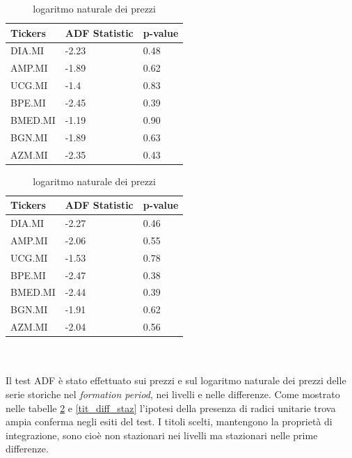 \documentclass[]{article}
\begin{document}
\begin{table}[H]

	\caption{Test di radice unitaria per i titoli nel \textit{formation period}}
	\begin{minipage}{.4\textwidth}
			\centering
		\caption{Prezzi}
		\begin{tabular}{@{}lll@{}}
			\toprule
			Tickers & ADF Statistic & p-value \\ \midrule
			DIA.MI  & -2.23         & 0.48    \\
			AMP.MI  & -1.89         & 0.62    \\
			UCG.MI  & -1.4          & 0.83    \\
			BPE.MI  & -2.45         & 0.39    \\
			BMED.MI & -1.19         & 0.90    \\
			BGN.MI  & -1.89         & 0.63    \\
			AZM.MI  & -2.35         & 0.43    \\ \bottomrule
		\end{tabular}
	\end{minipage}
    \begin{minipage}{.7\textwidth}
    	\centering
		\caption{logaritmo naturale dei prezzi}
		\begin{tabular}{@{}lll@{}}
			\toprule
			Tickers & ADF Statistic & p-value \\ \midrule
			DIA.MI  & -2.27         & 0.46    \\
			AMP.MI  & -2.06         & 0.55    \\
			UCG.MI  & -1.53         & 0.78    \\
			BPE.MI  & -2.47         & 0.38    \\
			BMED.MI & -2.44       & 0.39    \\
			BGN.MI  & -1.91         & 0.62    \\
			AZM.MI  & -2.04         & 0.56    \\ \bottomrule
		\end{tabular}
	\end{minipage}
	\label{tit_staz}
\end{table}
\
\\
\\
Il test ADF è stato effettuato  sui prezzi e sul logaritmo naturale dei prezzi delle serie storiche nel \textit{formation period}, nei livelli e nelle differenze. Come mostrato nelle tabelle \ref{tit_staz} e \ref{tit_diff_staz} l’ipotesi della presenza di radici unitarie trova ampia conferma negli esiti del test. I titoli scelti, mantengono la proprietà di integrazione, sono cioè non stazionari nei livelli ma stazionari nelle prime differenze.
\end{document}
